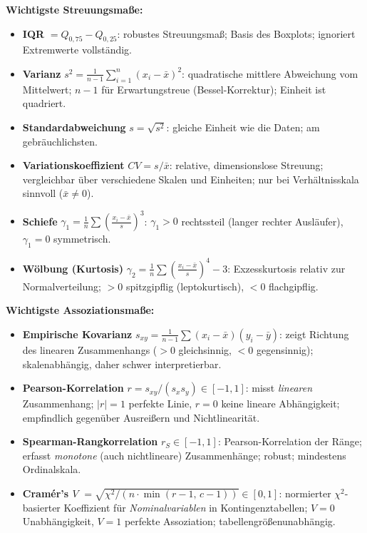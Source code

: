 \noindent\textbf{Wichtigste Streuungsmaße:}

\begin{itemize}[leftmargin=1.5em]
    \item \textbf{IQR} $= Q_{0{,}75} - Q_{0{,}25}$: robustes Streuungsmaß; Basis des Boxplots;
    ignoriert Extremwerte vollständig.

    \item \textbf{Varianz} $s^2 = \frac{1}{n-1}\sum_{i=1}^n (x_i - \bar{x})^2$:
    quadratische mittlere Abweichung vom Mittelwert; $n-1$ für Erwartungstreue (Bessel-Korrektur);
    Einheit ist quadriert.

    \item \textbf{Standardabweichung} $s = \sqrt{s^2}$: gleiche Einheit wie die Daten; am gebräuchlichsten.

    \item \textbf{Variationskoeffizient} $CV = s/\bar{x}$: relative, dimensionslose Streuung;
    vergleichbar über verschiedene Skalen und Einheiten; nur bei Verhältnisskala sinnvoll ($\bar{x} \neq 0$).

    \item \textbf{Schiefe} $\gamma_1 = \frac{1}{n}\sum\!\left(\tfrac{x_i-\bar{x}}{s}\right)^{\!3}$:
    $\gamma_1 > 0$ rechtssteil (langer rechter Ausläufer), $\gamma_1 = 0$ symmetrisch.

    \item \textbf{Wölbung (Kurtosis)} $\gamma_2 = \frac{1}{n}\sum\!\left(\tfrac{x_i-\bar{x}}{s}\right)^{\!4} - 3$:
    Exzesskurtosis relativ zur Normalverteilung; $>0$ spitzgipflig (leptokurtisch), $<0$ flachgipflig.
\end{itemize}

\noindent\textbf{Wichtigste Assoziationsmaße:}

\begin{itemize}[leftmargin=1.5em]
    \item \textbf{Empirische Kovarianz} $s_{xy} = \frac{1}{n-1}\sum(x_i-\bar{x})(y_i-\bar{y})$:
    zeigt Richtung des linearen Zusammenhangs ($>0$ gleichsinnig, $<0$ gegensinnig);
    skalenabhängig, daher schwer interpretierbar.

    \item \textbf{Pearson-Korrelation} $r = s_{xy}/(s_x s_y) \in [-1,1]$:
    misst \emph{linearen} Zusammenhang; $|r|=1$ perfekte Linie, $r=0$ keine lineare Abhängigkeit;
    empfindlich gegenüber Ausreißern und Nichtlinearität.

    \item \textbf{Spearman-Rangkorrelation} $r_S \in [-1,1]$:
    Pearson-Korrelation der Ränge; erfasst \emph{monotone} (auch nichtlineare) Zusammenhänge;
    robust; mindestens Ordinalskala.

    \item \textbf{Cramér's $V$} $= \sqrt{\chi^2 / (n \cdot \min(r-1,\, c-1))} \in [0,1]$:
    normierter $\chi^2$-basierter Koeffizient für \emph{Nominalvariablen} in Kontingenztabellen;
    $V=0$ Unabhängigkeit, $V=1$ perfekte Assoziation; tabellengrößenunabhängig.
\end{itemize}

